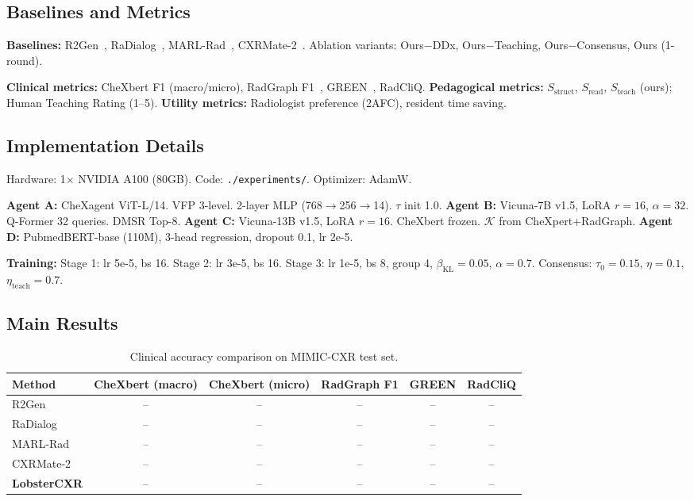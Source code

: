 \documentclass[runningheads,10pt]{llncs}
\newcommand{\Sstruct}{S_{\text{struct}}}
\newcommand{\Sread}{S_{\text{read}}}
\newcommand{\Steach}{S_{\text{teach}}}
\begin{document}
\subsection{Baselines and Metrics}

\textbf{Baselines:} R2Gen~\cite{r2gen}, RaDialog~\cite{radialog}, MARL-Rad~\cite{marlrad}, CXRMate-2~\cite{cxrmate2}. Ablation variants: Ours$-$DDx, Ours$-$Teaching, Ours$-$Consensus, Ours (1-round).

\textbf{Clinical metrics:} CheXbert F1 (macro/micro), RadGraph F1~\cite{radgraph}, GREEN~\cite{green}, RadCliQ.
\textbf{Pedagogical metrics:} $\Sstruct$, $\Sread$, $\Steach$ (ours); Human Teaching Rating (1--5).
\textbf{Utility metrics:} Radiologist preference (2AFC), resident time saving.

\subsection{Implementation Details}

Hardware: 1$\times$ NVIDIA A100 (80GB). Code: \texttt{./experiments/}. Optimizer: AdamW.

\noindent\textbf{Agent A:} CheXagent ViT-L/14. VFP 3-level. 2-layer MLP (768$\to$256$\to$14). $\tau$ init 1.0.
\textbf{Agent B:} Vicuna-7B v1.5, LoRA $r=16$, $\alpha=32$. Q-Former 32 queries. DMSR Top-8.
\textbf{Agent C:} Vicuna-13B v1.5, LoRA $r=16$. CheXbert frozen. $\mathcal{K}$ from CheXpert+RadGraph.
\textbf{Agent D:} PubmedBERT-base (110M), 3-head regression, dropout 0.1, lr 2e-5.

\noindent\textbf{Training:} Stage 1: lr 5e-5, bs 16. Stage 2: lr 3e-5, bs 16. Stage 3: lr 1e-5, bs 8, group 4, $\beta_{\text{KL}}=0.05$, $\alpha=0.7$. Consensus: $\tau_0=0.15$, $\eta=0.1$, $\eta_{\text{teach}}=0.7$.

\subsection{Main Results}

\begin{table}[t]
\centering
\caption{Clinical accuracy comparison on MIMIC-CXR test set.}
\label{tab:main}
\small
\begin{tabular}{lCCCCC}
\toprule
Method & CheXbert (macro) & CheXbert (micro) & RadGraph F1 & GREEN & RadCliQ \\
\midrule
R2Gen~\cite{r2gen} & -- & -- & -- & -- & -- \\
RaDialog~\cite{radialog} & -- & -- & -- & -- & -- \\
MARL-Rad~\cite{marlrad} & -- & -- & -- & -- & -- \\
CXRMate-2~\cite{cxrmate2} & -- & -- & -- & -- & -- \\
\midrule
\textbf{LobsterCXR} & -- & -- & -- & -- & -- \\
\bottomrule
\end{tabular}
\end{table}
\end{document}
